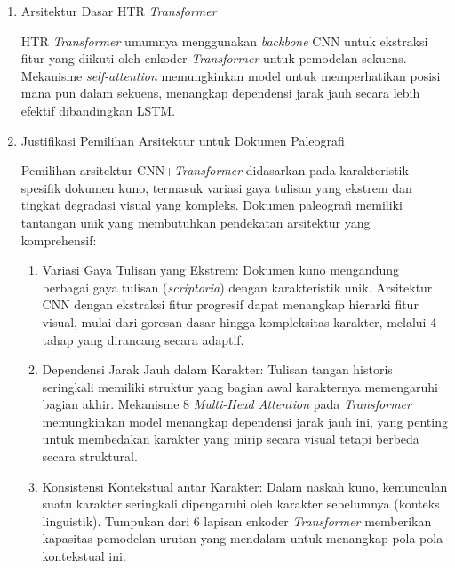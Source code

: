 \begin{enumerate}[leftmargin=*, labelindent=0pt, itemsep=1ex, topsep=0pt]

\item Arsitektur Dasar HTR \textit{Transformer}
\label{para:arsitektur-dasar-htr-transformer}

HTR \textit{Transformer} umumnya menggunakan \textit{backbone} CNN untuk ekstraksi fitur yang diikuti oleh enkoder \textit{Transformer} untuk pemodelan sekuens. Mekanisme \textit{self-attention} memungkinkan model untuk memperhatikan posisi mana pun dalam sekuens, menangkap dependensi jarak jauh secara lebih efektif dibandingkan LSTM.

\item Justifikasi Pemilihan Arsitektur untuk Dokumen Paleografi
\label{para:justifikasi-pemilihan-arsitektur}

Pemilihan arsitektur CNN+\textit{Transformer} didasarkan pada karakteristik spesifik dokumen kuno, termasuk variasi gaya tulisan yang ekstrem dan tingkat degradasi visual yang kompleks. Dokumen paleografi memiliki tantangan unik yang membutuhkan pendekatan arsitektur yang komprehensif:

\begin{enumerate}[leftmargin=1.5em, labelsep=0.5em, itemindent=0pt, label=\alph*., topsep=0pt, parsep=0pt, itemsep=0pt]
      \item Variasi Gaya Tulisan yang Ekstrem: Dokumen kuno mengandung berbagai gaya tulisan (\textit{scriptoria}) dengan karakteristik unik. Arsitektur CNN dengan ekstraksi fitur progresif dapat menangkap hierarki fitur visual, mulai dari goresan dasar hingga kompleksitas karakter, melalui 4 tahap yang dirancang secara adaptif.

      \item Dependensi Jarak Jauh dalam Karakter: Tulisan tangan historis seringkali memiliki struktur yang bagian awal karakternya memengaruhi bagian akhir. Mekanisme 8 \textit{Multi-Head Attention} pada \textit{Transformer} memungkinkan model menangkap dependensi jarak jauh ini, yang penting untuk membedakan karakter yang mirip secara visual tetapi berbeda secara struktural.

      \item Konsistensi Kontekstual antar Karakter: Dalam naskah kuno, kemunculan suatu karakter seringkali dipengaruhi oleh karakter sebelumnya (konteks linguistik). Tumpukan dari 6 lapisan enkoder \textit{Transformer} memberikan kapasitas pemodelan urutan yang mendalam untuk menangkap pola-pola kontekstual ini.


\end{enumerate}
\end{enumerate}
